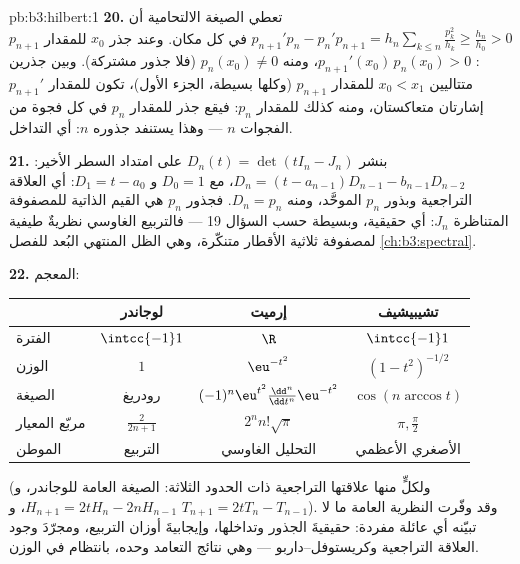 \begin{solution}{pb:b3:hilbert:1}
\textbf{20.} تعطي الصيغة الالتحامية أن $p_{n+1}'p_n -
p_n'p_{n+1} = h_n\sum_{k\leq n}\frac{p_k^2}{h_k} \geq
\frac{h_n}{h_0} > 0$ في كل مكان. وعند
جذر $x_0$ للمقدار $p_{n+1}$: $p_{n+1}'(x_0)\,p_n(x_0) > 0$، ومنه $p_n(x_0) \neq
0$ (فلا جذور
مشتركة). وبين جذرين متتاليين $x_0 < x_1$ للمقدار $p_{n+1}$
(وكلها بسيطة، الجزء الأول)، تكون للمقدار $p_{n+1}'$ إشارتان
متعاكستان، ومنه كذلك للمقدار $p_n$: فيقع جذر للمقدار $p_n$ في كل
فجوة من الفجوات $n$ --- وهذا يستنفد جذوره $n$: أي التداخل.

\textbf{21.} بنشر $D_n(t) = \det(tI_n - J_n)$ على امتداد السطر الأخير:
$D_n = (t - a_{n-1})D_{n-1} - b_{n-1}D_{n-2}$، مع $D_0 = 1$ و $D_1 = t - a_0$: أي العلاقة التراجعية
وبذور $p_n$ الموحَّد، ومنه $D_n = p_n$. فجذور $p_n$ هي القيم
الذاتية للمصفوفة المتناظرة $J_n$: أي حقيقية، وبسيطة حسب
السؤال 19 --- فالتربيع الغاوسي نظريةٌ طيفية لمصفوفة ثلاثية
الأقطار متنكّرة، وهي الظل المنتهي البُعد للفصل \cref{ch:b3:spectral}.

\textbf{22.} المعجم:
\begin{center}
\begin{tabular}{l|c|c|c}
 & لوجاندر & إرميت & تشيبيشيف\\
\hline
الفترة & $\intcc{-1}1$ & $\R$ & $\intcc{-1}1$\\
الوزن & $1$ & $\eu^{-t^2}$ & $(1-t^2)^{-1/2}$\\
الصيغة & رودريغ & $(-1)^n\eu^{t^2}
\frac{\dd^n}{\dd t^n}\eu^{-t^2}$ & $\cos(n\arccos t)$\\
مربّع المعيار & $\frac2{2n+1}$ & $2^nn!\sqrt\pi$ & $\pi,
\frac\pi2$\\
الموطن & التربيع & التحليل الغاوسي & الأصغري الأعظمي\\
\end{tabular}
\end{center}
(ولكلٍّ منها علاقتها التراجعية ذات الحدود الثلاثة: الصيغة
العامة للوجاندر، و $H_{n+1} = 2tH_n - 2nH_{n-1}$، و $T_{n+1} = 2tT_n -
T_{n-1}$). وقد وفّرت النظرية
العامة ما لا تبيّنه أي عائلة مفردة: حقيقيةَ الجذور وتداخلها،
وإيجابيةَ أوزان التربيع، ومجرّدَ وجود العلاقة التراجعية
وكريستوفل--داربو --- وهي نتائج التعامد وحده، بانتظام في
الوزن.


\end{solution}
